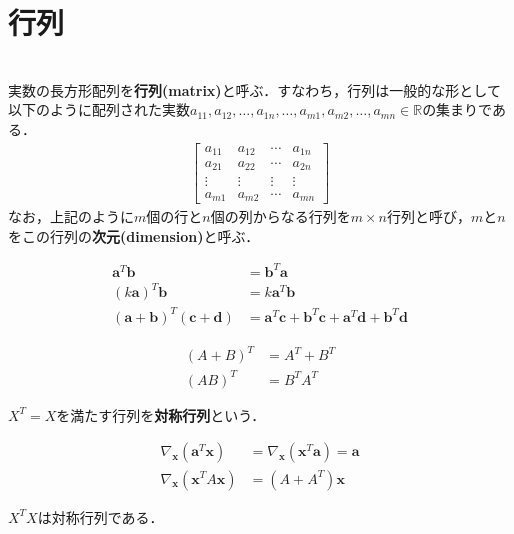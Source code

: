 \section{行列}

\begin{defi}[行列]　\\
実数の長方形配列を{\bf 行列(matrix)}と呼ぶ．すなわち，行列は一般的な形として以下のように配列された実数$a_{11},a_{12},\ldots,a_{1n},\ldots,a_{m1},a_{m2},\ldots,a_{mn} \in \mathbb{R}$の集まりである．
\begin{align*}
\begin{bmatrix}
a_{11} & a_{12} & \cdots & a_{1n} \\
a_{21} & a_{22} & \cdots & a_{2n} \\
\vdots & \vdots & \vdots & \vdots \\
a_{m1} & a_{m2} & \cdots & a_{mn} 
\end{bmatrix}	
\end{align*}
なお，上記のように$m$個の行と$n$個の列からなる行列を$m\times n$行列と呼び，$m$と$n$をこの行列の{\bf 次元(dimension)}と呼ぶ．
\end{defi}

\begin{theo}
\begin{align}
{\bm a}^T{\bm b}&= {\bm b}^T{\bm a}	\\
(k{\bm a})^T{\bm b}&= k{\bm a}^T{\bm b} \\
({\bm a}+{\bm b})^T({\bm c}+{\bm d})&= {\bm a}^T{\bm c}+{\bm b}^T{\bm c}+{\bm a}^T{\bm d}+{\bm b}^T{\bm d}
\end{align}
\end{theo}

\begin{theo}
\begin{align}
(A+B)^T&= A^T+B^T \\
(AB)^T&=B^TA^T	
\end{align}
\end{theo}

\begin{defi}
$X^T=X$を満たす行列を{\bf 対称行列}という．	
\end{defi}

\begin{theo}
\begin{align}
\nabla_{{\bm x}}({\bm a}^T {\bm x})&=\nabla_{{\bm x}}({\bm x}^T {\bm a})={\bm a}\\
\nabla_{{\bm x}}({\bm x}^T A{\bm x})&=(A+A^T){\bm x}
\end{align}
\end{theo}

\begin{theo}
$X^TX$は対称行列である．
\end{theo}